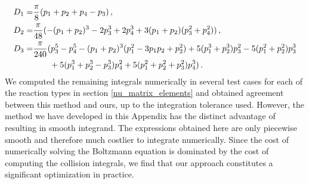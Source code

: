 \begin{align}
D_1=&\frac{\pi}{8}(p_1+p_2+p_4-p_3)\,,\\
D_2=&\frac{\pi}{48}(-(p_1+p_2)^3-2p_3^3+2p_4^3+3(p_1+p_2)(p_3^2+p_4^2))\,,\notag\\
D_3=&\frac{\pi}{240}(p_3^5-p_4^5-(p_1+p_2)^3(p_1^2-3p_1p_2+p_2^2)+5(p_1^3+p_2^3)p_3^2-5(p_1^2+p_2^2)p_3^3\notag\\
&\hspace{7mm}+5(p_1^3+p_2^3-p_3^3)p_4^2+5(p_1^2+p_2^2+p_3^2)p_4^3)\,.\notag
\end{align}
We computed the remaining integrals numerically in several test cases for each of the reaction types in section \ref{nu_matrix_elements} and obtained agreement between this method and ours, up to the integration tolerance used.  However, the method we have developed in this Appendix has the distinct advantage of resulting in  smooth integrand.  The expressions obtained here are only piecewise smooth and therefore much costlier to integrate numerically.  Since the cost of numerically solving the Boltzmann equation is dominated by the cost of computing the collision integrals, we find that our approach constitutes a  significant optimization in practice.



